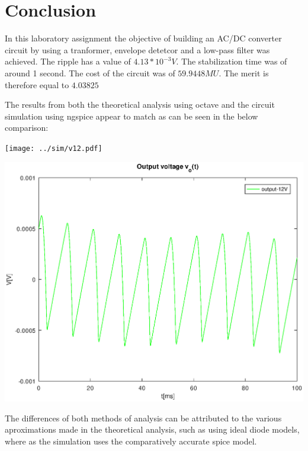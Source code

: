 \section{Conclusion}
\label{sec:conclusion}

In this laboratory assignment the objective of building an AC/DC converter circuit by using a tranformer, envelope detetcor and a low-pass filter was achieved.
 The ripple has a value of $4.13*10^{-3} V$.
 The stabilization time was of around 1 second.
 The cost of the circuit was of $59.9448 MU$.
 The merit is therefore equal to $4.03825$
 
The results from both the theoretical analysis using octave and the circuit
simulation using ngspice appear to match as can be seen in the below comparison:

\begin{minipage}[c]{0.50\linewidth}
\texttt{[image: ../sim/v12.pdf]}
\end{minipage} %
\hspace{1mm}
\begin{minipage}[c]{0.50\linewidth}
\includegraphics[width=1\linewidth]{v12.eps}
\end{minipage}

The differences of both methods of analysis can be attributed to the various aproximations
made in the theoretical analysis, such as using ideal diode models, where as the simulation uses the comparatively accurate spice model.